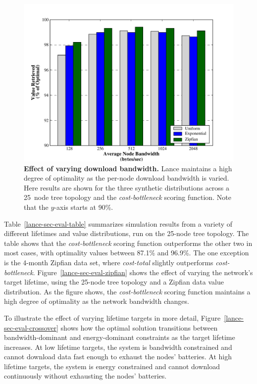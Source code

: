 \begin{figure}[t]
\label{lance-sec-eval-figspeeds}
\begin{center}
\includegraphics[width=1.0\hsize]{./6-lance/figs/gwa/speeds/POLICIES.pdf}
\end{center}
\caption{\textbf{Effect of varying download bandwidth.}
Lance maintains a high degree of optimality as the per-node download
bandwidth is varied.  Here results are shown for the three synthetic
distributions across a 25~node tree topology and the \emph{cost-bottleneck}
scoring function.  Note that the $y$-axis starts at 90\%.}
\end{figure}


Table~\ref{lance-sec-eval-table} summarizes simulation results from a variety
of different lifetimes and value distributions, run on the 25-node tree
topology. The table shows that the {\em cost-bottleneck} scoring function
outperforms the other two in most cases, with optimality values between
87.1\% and 96.9\%.  The one exception is the 4-month Zipfian data set, where
\emph{cost-total} slightly outperforms \emph{cost-bottleneck}.
Figure~\ref{lance-sec-eval-zipfian} shows the effect of varying the network's
target lifetime, using the 25-node tree topology and a Zipfian data value
distribution.  As the figure shows, the \emph{cost-bottleneck} scoring
function maintains a high degree of optimality as the network bandwidth
changes.

To illustrate the effect of varying lifetime targets in more detail,
Figure~\ref{lance-sec-eval-crossover} shows how the optimal solution
transitions between bandwidth-dominant and energy-dominant constraints as the
target lifetime increases. At low lifetime targets, the system is bandwidth
constrained and cannot download data fast enough to exhaust the nodes'
batteries.  At high lifetime targets, the system is energy constrained and
cannot download continuously without exhausting the nodes' batteries.  

